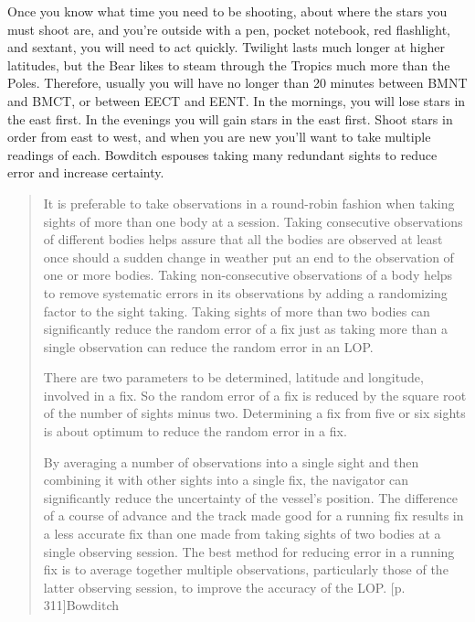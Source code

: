 \documentclass[letterpaper,12pt]{article}
\begin{document}
Once you know what time you need to be shooting, about where the stars you must shoot are, and you're outside with a pen, pocket notebook, red flashlight, and sextant, you will need to act quickly.
Twilight lasts much longer at higher latitudes, but the Bear likes to steam through the Tropics much more than the Poles.
Therefore, usually you will have no longer than 20 minutes between BMNT and BMCT, or between EECT and EENT.
In the mornings, you will lose stars in the east first. In the evenings you will gain stars in the east first.
Shoot stars in order from east to west, and when you are new you'll want to take multiple readings of each.
Bowditch espouses taking many redundant sights to reduce error and increase certainty.
\begin{quotation}
It is preferable to take observations in a round-robin fashion when taking sights of more than one body at a session.
Taking consecutive observations of different bodies helps assure that all the bodies are observed at least once should a sudden change in weather put an end to the observation of one or more bodies.
Taking non-consecutive observations of a body helps to remove systematic errors in its observations by adding a randomizing factor to the sight taking.
Taking sights of more than two bodies can significantly reduce the random error of a fix just as taking more than a single observation can reduce the random error in an LOP.

There are two parameters to be determined, latitude and longitude, involved in a fix.
So the random error of a fix is reduced by the square root of the number of sights minus two.
Determining a fix from five or six sights is about optimum to reduce the random error in a fix.

By averaging a number of observations into a single sight and then combining it with other sights into a single fix, the navigator can significantly reduce the uncertainty of the vessel’s position.
The difference of a course of advance and the track made good for a running fix results in a less accurate fix than one made from taking sights of two bodies at a single observing session.
The best method for reducing error in a running fix is to average together multiple observations, particularly those of the latter observing session, to improve the accuracy of the LOP. [p. 311]{Bowditch} 
\end{quotation}
\end{document}
